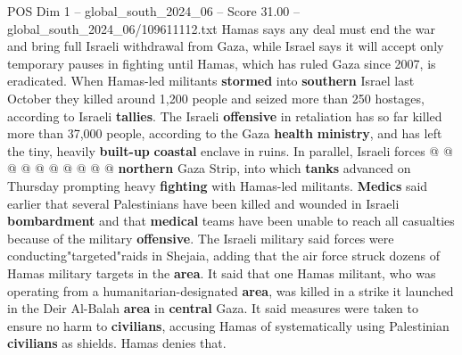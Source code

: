 \begin{textsample}{POS Dim 1 – global\_south\_2024\_06 – Score 31.00 – global\_south\_2024\_06/109611112.txt}
Hamas says any deal must end the war and bring full Israeli withdrawal from Gaza, while Israel says it will accept only temporary pauses in fighting until Hamas, which has ruled Gaza since 2007, is eradicated.
When Hamas-led militants \textbf{stormed} into \textbf{southern} Israel last October they killed around 1,200 people and seized more than 250 hostages, according to Israeli \textbf{tallies}.
The Israeli \textbf{offensive} in retaliation has so far killed more than 37,000 people, according to the Gaza \textbf{health} \textbf{ministry}, and has left the tiny, heavily \textbf{built-up} \textbf{coastal} enclave in ruins.
In parallel, Israeli forces @ @ @ @ @ @ @ @ @ @ \textbf{northern} Gaza Strip, into which \textbf{tanks} advanced on Thursday prompting heavy \textbf{fighting} with Hamas-led militants. \textbf{Medics} said earlier that several Palestinians have been killed and wounded in Israeli \textbf{bombardment} and that \textbf{medical} teams have been unable to reach all casualties because of the military \textbf{offensive}.
The Israeli military said forces were conducting"targeted"raids in Shejaia, adding that the air force struck dozens of Hamas military targets in the \textbf{area}.
It said that one Hamas militant, who was operating from a humanitarian-designated \textbf{area}, was killed in a strike it launched in the Deir Al-Balah \textbf{area} in \textbf{central} Gaza.
It said measures were taken to ensure no harm to \textbf{civilians}, accusing Hamas of systematically using Palestinian \textbf{civilians} as shields.
Hamas denies that.

\end{textsample}
